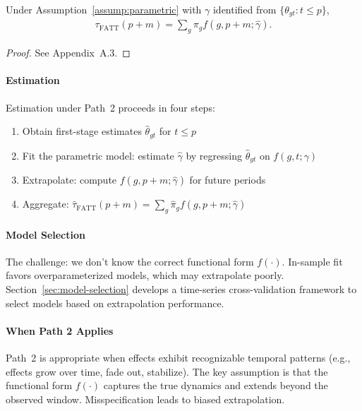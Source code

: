 \documentclass{article}
\begin{document}
\begin{proposition}
\label{prop:path2}
Under Assumption~\ref{assump:parametric} with $\gamma$ identified from $\{\theta_{gt} : t \leq p\}$,
\begin{align}
\tau_{\text{FATT}}(p+m) = \sum_g \pi_g f(g,p+m;\hat{\gamma}).
\end{align}
\end{proposition}

\begin{proof}
See Appendix~A.3.
\end{proof}

\paragraph{Estimation}


Estimation under Path~2 proceeds in four steps:
\begin{enumerate}
\item Obtain first-stage estimates $\hat{\theta}_{gt}$ for $t \leq p$
\item Fit the parametric model: estimate $\hat{\gamma}$ by regressing $\hat{\theta}_{gt}$ on $f(g,t;\gamma)$
\item Extrapolate: compute $f(g,p+m;\hat{\gamma})$ for future periods
\item Aggregate: $\hat{\tau}_{\text{FATT}}(p+m) = \sum_g \hat{\pi}_g f(g,p+m;\hat{\gamma})$
\end{enumerate}

\paragraph{Model Selection}


The challenge: we don't know the correct functional form $f(\cdot)$. In-sample fit favors overparameterized models, which may extrapolate poorly. Section~\ref{sec:model-selection} develops a time-series cross-validation framework to select models based on extrapolation performance.

\paragraph{When Path 2 Applies}


Path~2 is appropriate when effects exhibit recognizable temporal patterns (e.g., effects grow over time, fade out, stabilize). The key assumption is that the functional form $f(\cdot)$ captures the true dynamics and extends beyond the observed window. Misspecification leads to biased extrapolation.
\end{document}
